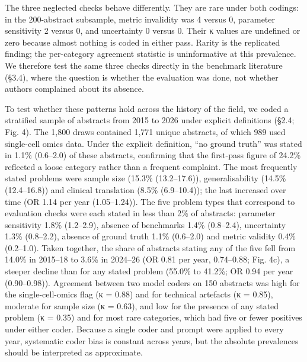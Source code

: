 \documentclass[11pt]{article}
\begin{document}
The three neglected checks behave differently. They are rare under both
codings: in the 200-abstract subsample, metric invalidity was 4 versus
0, parameter sensitivity 2 versus 0, and uncertainty 0 versus 0. Their κ
values are undefined or zero because almost nothing is coded in either
pass. Rarity is the replicated finding; the per-category agreement
statistic is uninformative at this prevalence. We therefore test the
same three checks directly in the benchmark literature (§3.4), where the
question is whether the evaluation was done, not whether authors
complained about its absence.

To test whether these patterns hold across the history of the field, we
coded a stratified sample of abstracts from 2015 to 2026 under explicit
definitions (§2.4; Fig. 4). The 1,800 draws contained 1,771 unique
abstracts, of which 989 used single-cell omics data. Under the explicit
definition, ``no ground truth'' was stated in 1.1\% (0.6--2.0) of these
abstracts, confirming that the first-pass figure of 24.2\% reflected a
loose category rather than a frequent complaint. The most frequently
stated problems were sample size (15.3\% (13.2--17.6)), generalisability
(14.5\% (12.4--16.8)) and clinical translation (8.5\% (6.9--10.4)); the
last increased over time (OR 1.14 per year (1.05--1.24)). The five
problem types that correspond to evaluation checks were each stated in
less than 2\% of abstracts: parameter sensitivity 1.8\% (1.2--2.9),
absence of benchmarks 1.4\% (0.8--2.4), uncertainty 1.3\% (0.8--2.2),
absence of ground truth 1.1\% (0.6--2.0) and metric validity 0.4\%
(0.2--1.0). Taken together, the share of abstracts stating any of the
five fell from 14.0\% in 2015--18 to 3.6\% in 2024--26 (OR 0.81 per
year, 0.74--0.88; Fig. 4c), a steeper decline than for any stated
problem (55.0\% to 41.2\%; OR 0.94 per year (0.90--0.98)). Agreement
between two model coders on 150 abstracts was high for the
single-cell-omics flag (κ = 0.88) and for technical artefacts (κ =
0.85), moderate for sample size (κ = 0.63), and low for the presence of
any stated problem (κ = 0.35) and for most rare categories, which had
five or fewer positives under either coder. Because a single coder and
prompt were applied to every year, systematic coder bias is constant
across years, but the absolute prevalences should be interpreted as
approximate.
\end{document}

